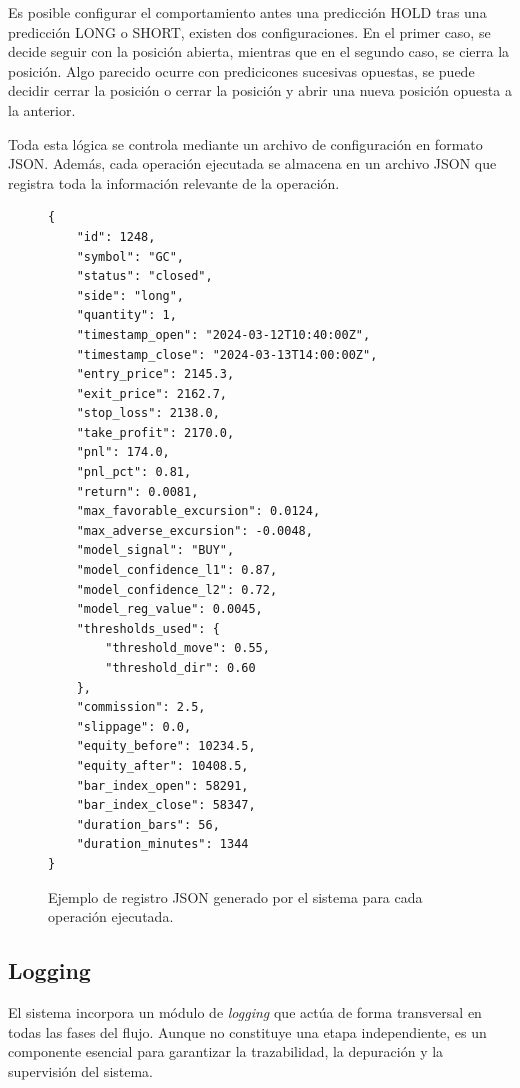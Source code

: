 Es posible configurar el comportamiento antes una predicción HOLD tras una predicción LONG o SHORT, existen dos configuraciones. En el primer caso, se
decide seguir con la posición abierta, mientras que en el segundo caso, se cierra la posición. Algo parecido ocurre con predicicones sucesivas
opuestas, se puede decidir cerrar la posición o cerrar la posición y abrir una nueva posición opuesta a la anterior.

Toda esta lógica se controla mediante un archivo de configuración en formato JSON. Además, cada operación ejecutada se almacena en un archivo JSON
que registra toda la información relevante de la operación.

\begin{figure}[H]
    \centering
    \begin{minipage}{0.9\linewidth}
    \begin{verbatim}
{
    "id": 1248,
    "symbol": "GC",
    "status": "closed",
    "side": "long",
    "quantity": 1,
    "timestamp_open": "2024-03-12T10:40:00Z",
    "timestamp_close": "2024-03-13T14:00:00Z",
    "entry_price": 2145.3,
    "exit_price": 2162.7,
    "stop_loss": 2138.0,
    "take_profit": 2170.0,
    "pnl": 174.0,
    "pnl_pct": 0.81,
    "return": 0.0081,
    "max_favorable_excursion": 0.0124,
    "max_adverse_excursion": -0.0048,
    "model_signal": "BUY",
    "model_confidence_l1": 0.87,
    "model_confidence_l2": 0.72,
    "model_reg_value": 0.0045,
    "thresholds_used": {
        "threshold_move": 0.55,
        "threshold_dir": 0.60
    },
    "commission": 2.5,
    "slippage": 0.0,
    "equity_before": 10234.5,
    "equity_after": 10408.5,
    "bar_index_open": 58291,
    "bar_index_close": 58347,
    "duration_bars": 56,
    "duration_minutes": 1344
}
    \end{verbatim}
    \end{minipage}
    \caption{Ejemplo de registro JSON generado por el sistema para cada operación ejecutada.}
\end{figure}


\subsection{Logging}

El sistema incorpora un módulo de \textit{logging} que actúa de forma transversal en todas las fases del flujo. Aunque no constituye una etapa
independiente, es un componente esencial para garantizar la trazabilidad, la depuración y la supervisión del sistema.

